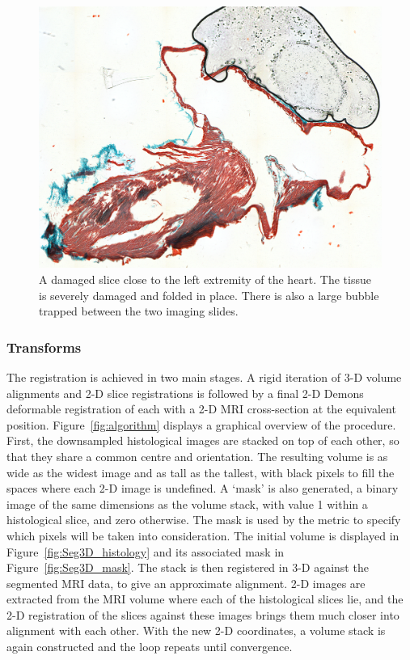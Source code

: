       \begin{landscape}
        \begin{figure}[htbp]
          \centering
          \includegraphics[width=1.3\textwidth]{Ch6/Figs/damaged_slice}
          \caption{A damaged slice close to the left extremity of the heart. The tissue is severely damaged and folded in place. There is also a large bubble trapped between the two imaging slides.}
          \label{fig:damaged_slice}
        \end{figure}
      \end{landscape}
      
    
    \subsubsection{Transforms} %
    \label{sub:transforms}
      The registration is achieved in two main stages. A rigid iteration of 3-D volume alignments and 2-D slice registrations is followed by a final 2-D Demons\cite{Yoo:2002p160} deformable registration of each with a 2-D MRI cross-section at the equivalent position. Figure~\ref{fig:algorithm} displays a graphical overview of the procedure. First, the downsampled histological images are stacked on top of each other, so that they share a common centre and orientation. The resulting volume is as wide as the widest image and as tall as the tallest, with black pixels to fill the spaces where each 2-D image is undefined. A `mask' is also generated, a binary image of the same dimensions as the volume stack, with value 1 within a histological slice, and zero otherwise. The mask is used by the metric to specify which pixels will be taken into consideration. The initial volume is displayed in Figure~\ref{fig:Seg3D_histology} and its associated mask in Figure~\ref{fig:Seg3D_mask}. The stack is then registered in 3-D against the segmented MRI data, to give an approximate alignment. 2-D images are extracted from the MRI volume where each of the histological slices lie, and the 2-D registration of the slices against these images brings them much closer into alignment with each other. With the new 2-D coordinates, a volume stack is again constructed and the loop repeats until convergence.
      

